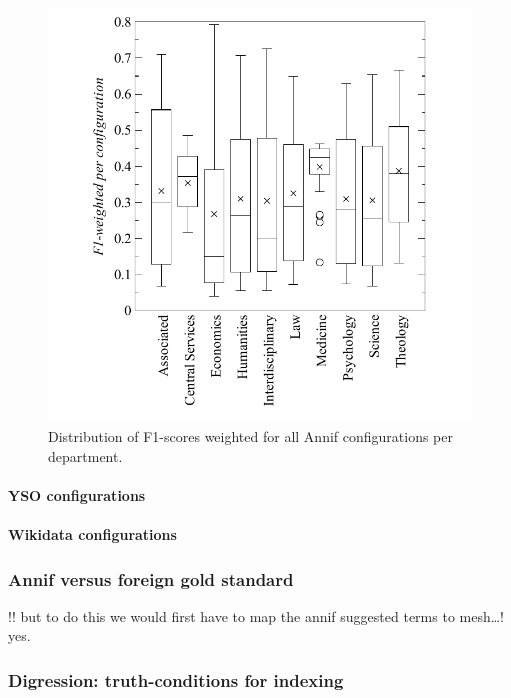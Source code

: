 \begin{figure}
\centering
\includegraphics{images/metrics_dept_distribution.pdf}
\caption{Distribution of F1-scores weighted for all Annif configurations
per department.}
\end{figure}

\hypertarget{yso-configurations}{%
\paragraph{YSO configurations}\label{yso-configurations}}

\hypertarget{wikidata-configurations}{%
\paragraph{Wikidata configurations}\label{wikidata-configurations}}

\hypertarget{annif-versus-foreign-gold-standard}{%
\subsubsection{Annif versus foreign gold
standard}\label{annif-versus-foreign-gold-standard}}

!! but to do this we would first have to map the annif suggested terms
to mesh\ldots! yes.

\hypertarget{digression-truth-conditions-for-indexing}{%
\subsubsection{Digression: truth-conditions for
indexing}\label{digression-truth-conditions-for-indexing}}

